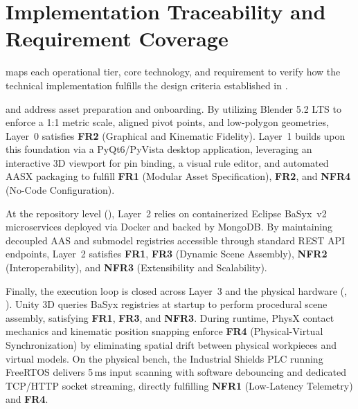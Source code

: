 \section{Implementation Traceability and Requirement Coverage}
\label{sec:impl_traceability}

 maps each operational tier, core technology, and requirement to verify how the technical implementation fulfills the design criteria established in .

 and  address asset preparation and onboarding. By utilizing Blender 5.2 LTS to enforce a 1:1 metric scale, aligned pivot points, and low-polygon geometries, Layer~0 satisfies \textbf{FR2} (Graphical and Kinematic Fidelity). Layer~1 builds upon this foundation via a PyQt6/PyVista desktop application, leveraging an interactive 3D viewport for pin binding, a visual rule editor, and automated \gls{AASX} packaging to fulfill \textbf{FR1} (Modular Asset Specification), \textbf{FR2}, and \textbf{NFR4} (No-Code Configuration).

At the repository level (), Layer~2 relies on containerized Eclipse BaSyx~v2 microservices deployed via Docker and backed by MongoDB. By maintaining decoupled \gls{AAS} and submodel registries accessible through standard \gls{REST} \gls{API} endpoints, Layer~2 satisfies \textbf{FR1}, \textbf{FR3} (Dynamic Scene Assembly), \textbf{NFR2} (Interoperability), and \textbf{NFR3} (Extensibility and Scalability). 

Finally, the execution loop is closed across Layer~3 and the physical hardware (, ). Unity 3D queries BaSyx registries at startup to perform procedural scene assembly, satisfying \textbf{FR1}, \textbf{FR3}, and \textbf{NFR3}. During runtime, PhysX contact mechanics and kinematic position snapping enforce \textbf{FR4} (Physical-Virtual Synchronization) by eliminating spatial drift between physical workpieces and virtual models. On the physical bench, the Industrial Shields \gls{PLC} running FreeRTOS delivers 5\,ms input scanning with software debouncing and dedicated \gls{TCP}/\gls{HTTP} socket streaming, directly fulfilling \textbf{NFR1} (Low-Latency Telemetry) and \textbf{FR4}.

